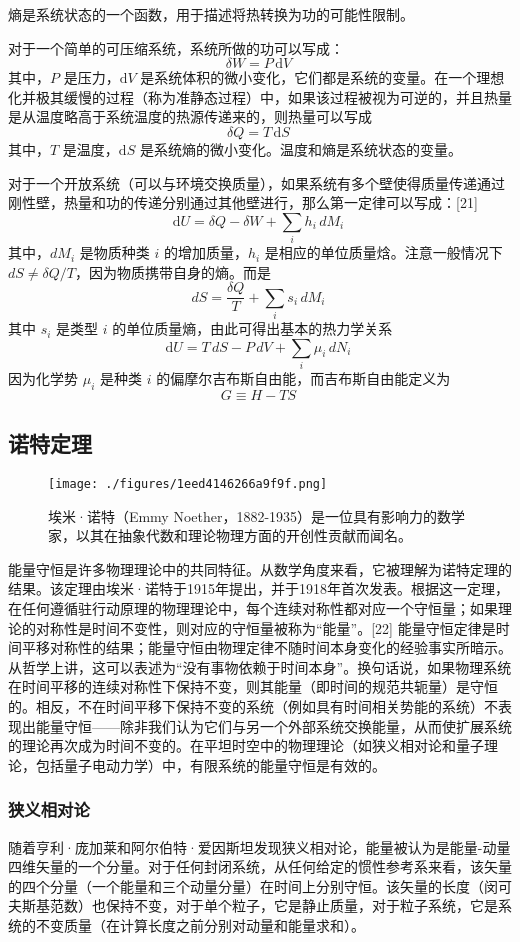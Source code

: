 熵是系统状态的一个函数，用于描述将热转换为功的可能性限制。

对于一个简单的可压缩系统，系统所做的功可以写成：
\[
\delta W = P \, \mathrm{d}V~
\]
其中，\( P \) 是压力，\( \mathrm{d}V \) 是系统体积的微小变化，它们都是系统的变量。在一个理想化并极其缓慢的过程（称为准静态过程）中，如果该过程被视为可逆的，并且热量是从温度略高于系统温度的热源传递来的，则热量可以写成
\[
\delta Q = T \, \mathrm{d}S~
\]
其中，\( T \) 是温度，\( \mathrm{d}S \) 是系统熵的微小变化。温度和熵是系统状态的变量。

对于一个开放系统（可以与环境交换质量），如果系统有多个壁使得质量传递通过刚性壁，热量和功的传递分别通过其他壁进行，那么第一定律可以写成：[21]
\[
\mathrm{d}U = \delta Q - \delta W + \sum_{i} h_{i} \, dM_{i}~
\]
其中，\( dM_{i} \) 是物质种类 \( i \) 的增加质量，\( h_{i} \) 是相应的单位质量焓。注意一般情况下 \( dS \neq \delta Q / T \)，因为物质携带自身的熵。而是
\[
dS = \frac{\delta Q}{T} + \sum_{i} s_{i} \, dM_{i}~
\]
其中 \( s_{i} \) 是类型 \( i \) 的单位质量熵，由此可得出基本的热力学关系
\[
\mathrm{d}U = T \, dS - P \, dV + \sum_{i} \mu_{i} \, dN_{i}~
\]
因为化学势 \( \mu_{i} \) 是种类 \( i \) 的偏摩尔吉布斯自由能，而吉布斯自由能定义为
\[
G \equiv H - TS~
\]
\subsection{诺特定理}
\begin{figure}[ht]
\centering
\texttt{[image: ./figures/1eed4146266a9f9f.png]}
\caption{埃米·诺特（Emmy Noether，1882-1935）是一位具有影响力的数学家，以其在抽象代数和理论物理方面的开创性贡献而闻名。} \label{fig_NLSH_8}
\end{figure}
能量守恒是许多物理理论中的共同特征。从数学角度来看，它被理解为诺特定理的结果。该定理由埃米·诺特于1915年提出，并于1918年首次发表。根据这一定理，在任何遵循驻行动原理的物理理论中，每个连续对称性都对应一个守恒量；如果理论的对称性是时间不变性，则对应的守恒量被称为“能量”。[22] 能量守恒定律是时间平移对称性的结果；能量守恒由物理定律不随时间本身变化的经验事实所暗示。从哲学上讲，这可以表述为“没有事物依赖于时间本身”。换句话说，如果物理系统在时间平移的连续对称性下保持不变，则其能量（即时间的规范共轭量）是守恒的。相反，不在时间平移下保持不变的系统（例如具有时间相关势能的系统）不表现出能量守恒——除非我们认为它们与另一个外部系统交换能量，从而使扩展系统的理论再次成为时间不变的。在平坦时空中的物理理论（如狭义相对论和量子理论，包括量子电动力学）中，有限系统的能量守恒是有效的。
\subsubsection{狭义相对论}
随着亨利·庞加莱和阿尔伯特·爱因斯坦发现狭义相对论，能量被认为是能量-动量四维矢量的一个分量。对于任何封闭系统，从任何给定的惯性参考系来看，该矢量的四个分量（一个能量和三个动量分量）在时间上分别守恒。该矢量的长度（闵可夫斯基范数）也保持不变，对于单个粒子，它是静止质量，对于粒子系统，它是系统的不变质量（在计算长度之前分别对动量和能量求和）。

